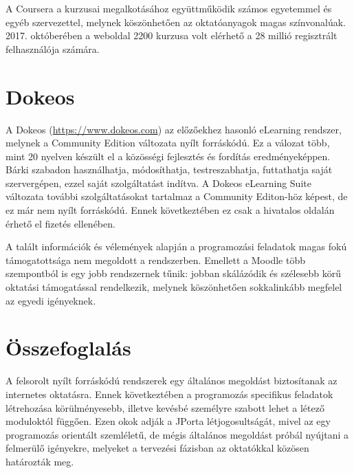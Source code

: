 A Coursera a kurzusai megalkotásához együttműködik számos egyetemmel és egyéb szervezettel, melynek köszönhetően az oktatóanyagok magas színvonalúak. 2017. októberében a weboldal 2200 kurzusa volt elérhető a 28 millió regisztrált felhasználója számára.

\section{Dokeos}

A Dokeos (\url{https://www.dokeos.com}) az előzőekhez hasonló eLearning rendszer, melynek a Community Edition változata nyílt forráskódú. Ez a válozat több, mint 20 nyelven készült el a közösségi fejlesztés és fordítás eredményeképpen. Bárki szabadon használhatja, módosíthatja, testreszabhatja, futtathatja saját szervergépen, ezzel saját szolgáltatást indítva. A Dokeos eLearning Suite változata további szolgáltatásokat tartalmaz a Community Editon-höz képest, de ez már nem nyílt forráskódú. Ennek következtében ez csak a hivatalos oldalán érhető el fizetés ellenében.

A talált információk és vélemények alapján a programozási feladatok magas fokú támogatottsága nem megoldott a rendszerben. Emellett a Moodle több szempontból is egy jobb rendszernek tűnik:  jobban skálázódik és szélesebb körű oktatási támogatással rendelkezik, melynek köszönhetően sokkalinkább megfelel az egyedi igényeknek. \cite{DokeosVsMoodle}

\section{Összefoglalás}

A felsorolt nyílt forráskódú rendszerek egy általános megoldást biztosítanak az internetes oktatásra. Ennek következtében a programozás specifikus feladatok létrehozása körülményesebb, illetve kevésbé személyre szabott lehet a létező moduloktól függően. Ezen okok adják a JPorta létjogosultságát, mivel az egy programozás orientált szemléletű, de mégis általános megoldást próbál nyújtani a felmerülő igényekre, melyeket a tervezési fázisban az oktatókkal közösen határozták meg.